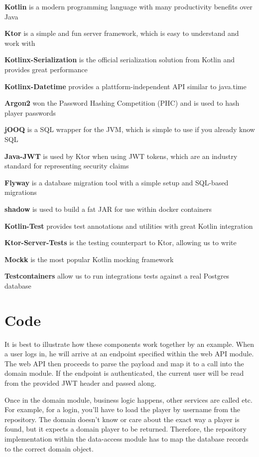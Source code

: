 \begin{compactitem}
    \item \textbf{Kotlin} is a modern programming language with many productivity benefits over Java
    \item \textbf{Ktor} is a simple and fun server framework, which is easy to understand and work with
    \item \textbf{Kotlinx-Serialization} is the official serialization solution from Kotlin and provides great performance
    \item \textbf{Kotlinx-Datetime} provides a plattform-independent API similar to java.time
    \item \textbf{Argon2} won the Password Hashing Competition (PHC) and is used to hash player passwords
    \item \textbf{jOOQ} is a SQL wrapper for the JVM, which is simple to use if you already know SQL
    \item \textbf{Java-JWT} is used by Ktor when using JWT tokens, which are an industry standard for representing security claims
    \item \textbf{Flyway} is a database migration tool with a simple setup and SQL-based migrations
    \item \textbf{shadow} is used to build a fat JAR for use within docker containers
    \item \textbf{Kotlin-Test} provides test annotations and utilities with great Kotlin integration
    \item \textbf{Ktor-Server-Tests} is the testing counterpart to Ktor, allowing us to write
    \item \textbf{Mockk} is the most popular Kotlin mocking framework
    \item \textbf{Testcontainers} allow us to run integrations tests against a real Postgres database
\end{compactitem}

\section{Code}
It is best to illustrate how these components work together by an example.
When a user logs in, he will arrive at an endpoint specified within the web API module.
The web API then proceeds to parse the payload and map it to a call into the domain module.
If the endpoint is authenticated, the current user will be read from the provided JWT header and passed along.

Once in the domain module, business logic happens, other services are called etc.
For example, for a login, you'll have to load the player by username from the repository.
The domain doesn't know or care about the exact way a player is found, but it expects a domain player to be returned.
Therefore, the repository implementation within the data-access module has to map the database records to the correct domain object.


